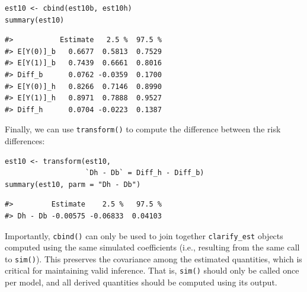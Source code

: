 \begin{verbatim}
est10 <- cbind(est10b, est10h)
summary(est10)
\end{verbatim}
\begin{verbatim}
#>           Estimate   2.5 %  97.5 %
#> E[Y(0)]_b   0.6677  0.5813  0.7529
#> E[Y(1)]_b   0.7439  0.6661  0.8016
#> Diff_b      0.0762 -0.0359  0.1700
#> E[Y(0)]_h   0.8266  0.7146  0.8990
#> E[Y(1)]_h   0.8971  0.7888  0.9527
#> Diff_h      0.0704 -0.0223  0.1387
\end{verbatim}
Finally, we can use \texttt{transform()} to compute the difference between the risk differences:
\begin{verbatim}
est10 <- transform(est10,
                   `Dh - Db` = Diff_h - Diff_b)
summary(est10, parm = "Dh - Db")
\end{verbatim}
\begin{verbatim}
#>         Estimate    2.5 %   97.5 %
#> Dh - Db -0.00575 -0.06833  0.04103
\end{verbatim}
Importantly, \texttt{cbind()} can only be used to join together \texttt{clarify\_est} objects computed using the same simulated coefficients (i.e., resulting from the same call to \texttt{sim()}). This preserves the covariance among the estimated quantities, which is critical for maintaining valid inference. That is, \texttt{sim()} should only be called once per model, and all derived quantities should be computed using its output.
